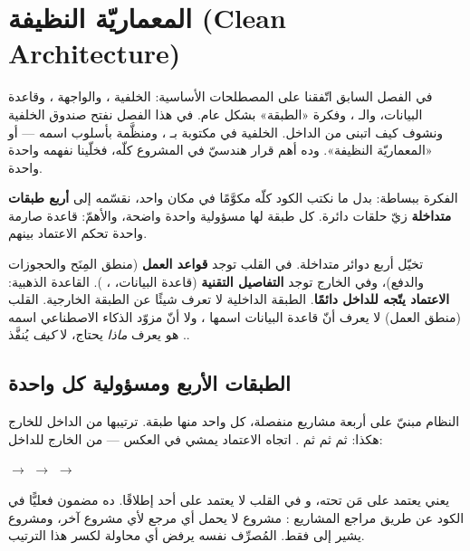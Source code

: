 \section{المعماريّة النظيفة (Clean Architecture)}

في الفصل السابق اتّفقنا على المصطلحات الأساسية: الخلفية ، والواجهة
، وقاعدة البيانات، والـ ، وفكرة «الطبقة» بشكل عام. في هذا
الفصل نفتح صندوق الخلفية ونشوف كيف اتبنى من الداخل. الخلفية في 
مكتوبة بـ ، ومنظَّمة بأسلوب اسمه  — أو
«المعماريّة النظيفة». وده أهم قرار هندسيّ في المشروع كلّه، فخلّينا نفهمه واحدة واحدة.

الفكرة ببساطة: بدل ما نكتب الكود كلّه مكوَّمًا في مكان واحد، نقسّمه إلى \textbf{أربع
طبقات متداخلة} زيّ حلقات دائرة. كل طبقة لها مسؤولية واحدة واضحة، والأهمّ: قاعدة صارمة
واحدة تحكم الاعتماد بينهم.

\begin{idea}
تخيّل أربع دوائر متداخلة. في القلب توجد \textbf{قواعد العمل} (منطق المِنَح
والحجوزات والدفع)، وفي الخارج توجد \textbf{التفاصيل التقنية} (قاعدة البيانات،
، ). القاعدة الذهبية: \textbf{الاعتماد يتّجه للداخل دائمًا}.
الطبقة الداخلية لا تعرف شيئًا عن الطبقة الخارجية. القلب (منطق العمل) لا يعرف أنّ
قاعدة البيانات اسمها ، ولا أنّ مزوّد الذكاء الاصطناعي اسمه
. هو يعرف \emph{ماذا} يحتاج، لا \emph{كيف} يُنفَّذ.
\end{idea}

\subsection{الطبقات الأربع ومسؤولية كل واحدة}

النظام مبنيّ على أربعة مشاريع  منفصلة، كل واحد منها طبقة. ترتيبها من
الداخل للخارج هكذا:  ثم  ثم  ثم
. اتجاه الاعتماد يمشي في العكس — من الخارج للداخل:

\begin{center}\begin{LTR}
 $\longrightarrow$  $\longrightarrow$  $\longrightarrow$ 
\end{LTR}\end{center}

يعني  يعتمد على مَن تحته، و في القلب لا يعتمد على أحد إطلاقًا.
ده مضمون فعليًّا في الكود عن طريق مراجع المشاريع : مشروع
 لا يحمل أي مرجع لأي مشروع آخر، ومشروع
 يشير إلى  فقط. المُصرِّف
 نفسه يرفض أي محاولة لكسر هذا الترتيب.

